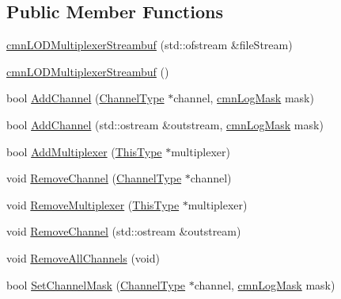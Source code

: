 \subsection*{Public Member Functions}
\begin{DoxyCompactItemize}
\item 
\hyperlink{classcmn_l_o_d_multiplexer_streambuf_aa1c3f01ca13437d1c457632be57e4900}{cmn\-L\-O\-D\-Multiplexer\-Streambuf} (std\-::ofstream \&file\-Stream)
\item 
\hyperlink{classcmn_l_o_d_multiplexer_streambuf_a0dc545e5ba6fda49610befbea04b211b}{cmn\-L\-O\-D\-Multiplexer\-Streambuf} ()
\item 
bool \hyperlink{classcmn_l_o_d_multiplexer_streambuf_a13062543394fee2e08419f0ecad3b5c1}{Add\-Channel} (\hyperlink{classcmn_l_o_d_multiplexer_streambuf_aa3b0347701c1aa5157a719978a1a6386}{Channel\-Type} $\ast$channel, \hyperlink{cmn_log_lo_d_8h_a44b6ef7560b0d204460b0a54f1a5d702}{cmn\-Log\-Mask} mask)
\item 
bool \hyperlink{classcmn_l_o_d_multiplexer_streambuf_a7aa3f784619695c5c32e7b475dc2b337}{Add\-Channel} (std\-::ostream \&outstream, \hyperlink{cmn_log_lo_d_8h_a44b6ef7560b0d204460b0a54f1a5d702}{cmn\-Log\-Mask} mask)
\item 
bool \hyperlink{classcmn_l_o_d_multiplexer_streambuf_a5cabf091e5c5dacea8052ea14d84686c}{Add\-Multiplexer} (\hyperlink{classcmn_l_o_d_multiplexer_streambuf_aa50efd43cb53bb6be746e3990e02452a}{This\-Type} $\ast$multiplexer)
\item 
void \hyperlink{classcmn_l_o_d_multiplexer_streambuf_ab1c5504083f7074b012335f38593f7c2}{Remove\-Channel} (\hyperlink{classcmn_l_o_d_multiplexer_streambuf_aa3b0347701c1aa5157a719978a1a6386}{Channel\-Type} $\ast$channel)
\item 
void \hyperlink{classcmn_l_o_d_multiplexer_streambuf_adc4afc63b900a50cd06fc5c330a7c04c}{Remove\-Multiplexer} (\hyperlink{classcmn_l_o_d_multiplexer_streambuf_aa50efd43cb53bb6be746e3990e02452a}{This\-Type} $\ast$multiplexer)
\item 
void \hyperlink{classcmn_l_o_d_multiplexer_streambuf_acd6d9a71c678728ce1e57ff05ddcc872}{Remove\-Channel} (std\-::ostream \&outstream)
\item 
void \hyperlink{classcmn_l_o_d_multiplexer_streambuf_a5d665f8abdc2561257af048146b80cdc}{Remove\-All\-Channels} (void)
\item 
bool \hyperlink{classcmn_l_o_d_multiplexer_streambuf_a963eadbf72872649aa91d2ab59d2c433}{Set\-Channel\-Mask} (\hyperlink{classcmn_l_o_d_multiplexer_streambuf_aa3b0347701c1aa5157a719978a1a6386}{Channel\-Type} $\ast$channel, \hyperlink{cmn_log_lo_d_8h_a44b6ef7560b0d204460b0a54f1a5d702}{cmn\-Log\-Mask} mask)

\end{DoxyCompactItemize}
